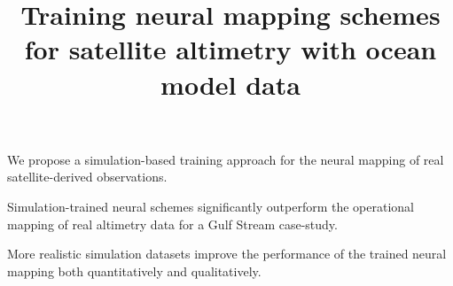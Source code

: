 \documentclass[draft]{agujournal2019}
\begin{document}
%
%


\title{Training neural mapping schemes for satellite altimetry with ocean model data}







\begin{keypoints}
\item We propose a simulation-based training approach for the neural mapping of real satellite-derived observations.
\item Simulation-trained neural schemes significantly outperform the operational mapping of real altimetry data for a Gulf Stream case-study.
\item More realistic simulation datasets improve the performance of the trained neural mapping both quantitatively and qualitatively. 

\end{keypoints}
\end{document}
